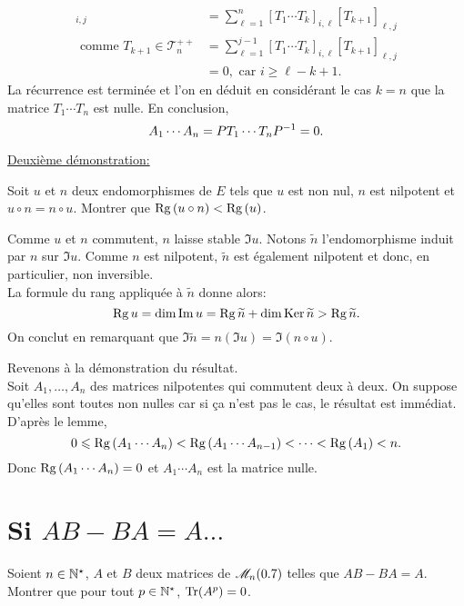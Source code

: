 \begin{solution}
\begin{enumerate}
\begin{itemize}
\begin{align*}
                [T_1 \cdots T_{k+1}]_{i,j} &= \sum_{\ell=1}^n [T_1 \cdots T_k]_{i, \ell} [T_{k+1}]_{\ell, j} \\
                \text{ comme } T_{k+1} \in \mathscr{T}_n^{++} &= \sum_{\ell=1}^{j-1} [T_1 \cdots T_k]_{i, \ell} [T_{k+1}]_{\ell, j} \\
                &= 0, \text{ car } i \geqslant \ell - k +1.
            \end{align*}
            La récurrence est terminée et l'on en déduit en considérant le cas $k = n$ que la matrice $T_1 \cdots T_n$ est nulle. En conclusion,
            $$A_1 \cdots A_n = P T_1 \cdots T_n P^{-1} = 0.$$
        \end{itemize}
        \underline{Deuxième démonstration:} \\
        \begin{lemme}
            Soit $u$ et $n$ deux endomorphismes de $E$ tels que $u$ est non nul, $n$ est nilpotent et $u \circ n = n \circ u$. Montrer que $\mathrm{Rg}\,(u \circ n) < \mathrm{Rg}\,(u)$.
        \end{lemme}
        \begin{preuve}
            Comme $u$ et $n$ commutent, $n$ laisse stable $\Im u$. Notons $\widetilde{n}$ l'endomorphisme induit par $n$ sur $\Im u$. Comme $n$ est nilpotent, $\widetilde{n}$ est également nilpotent et donc, en particulier, non inversible. \\
            La formule du rang appliquée à $\widetilde{n}$ donne alors:
            $$\mathrm{Rg}\, u = \dim \Im u = \mathrm{Rg}\, \widetilde{n} + \dim \mathrm{Ker}\, \widetilde{n} > \mathrm{Rg}\, \widetilde{n}.$$
            On conclut en remarquant que $\Im \widetilde{n} = n(\Im u) = \Im (n \circ u)$.
        \end{preuve}
    \end{enumerate}
    Revenons à la démonstration du résultat. \\
    Soit $A_1, \dots, A_n$ des matrices nilpotentes qui commutent deux à deux. On suppose qu'elles sont toutes non nulles car si ça n'est pas le cas, le résultat est immédiat. \\
    D'après le lemme,
    $$0 \leqslant \mathrm{Rg}\,(A_1 \cdots A_n) < \mathrm{Rg}\,(A_1 \cdots A_{n-1}) < \cdots < \mathrm{Rg}\,(A_1) < n.$$
    Donc $\mathrm{Rg}\,(A_1 \cdots A_n) = 0$ et $A_1 \cdots A_n$ est la matrice nulle.
\end{solution}


\section{Si \texorpdfstring{$AB - BA = A \dots$}{AB-BA=A...}}
\begin{exercice}
    Soient $n \in \mathbb{N}^\star$, $A$ et $B$ deux matrices de $\mathscr{M}_n(0.7)$ telles que $AB - BA = A$. Montrer que pour tout $p \in \mathbb{N}^\star$, $\mathrm{Tr}(A^p) = 0$.
\end{exercice}

